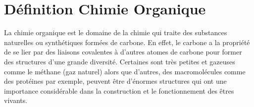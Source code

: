 \documentclass[a4paper, oneside]{book}
\begin{document}
\section*{Définition Chimie Organique}

La chimie organique est le domaine de la chimie qui traite des substances naturelles ou synthétiques formées de carbone. En effet, le carbone a la propriété de se lier par des  liaisons covalentes à d'autres atomes de carbone pour former des structures d’une grande diversité. Certaines sont très petites et gazeuses comme le méthane (gaz naturel) alors que d'autres, des macromolécules comme des protéines par exemple, peuvent être d'énormes structures qui ont une importance considérable dans la construction et le fonctionnement des êtres vivants.
\vspace*{\fill}



\end{document}

